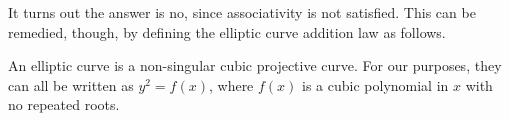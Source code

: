 It turns out the answer is no, since associativity is not satisfied. This can be remedied, though, by defining the elliptic curve addition law as follows.

\begin{definition}
	An elliptic curve is a non-singular cubic projective curve. For our purposes, they can all be written as $y^2 = f(x)$, where $f(x)$ is a cubic polynomial in $x$ with no repeated roots.
\end{definition}
